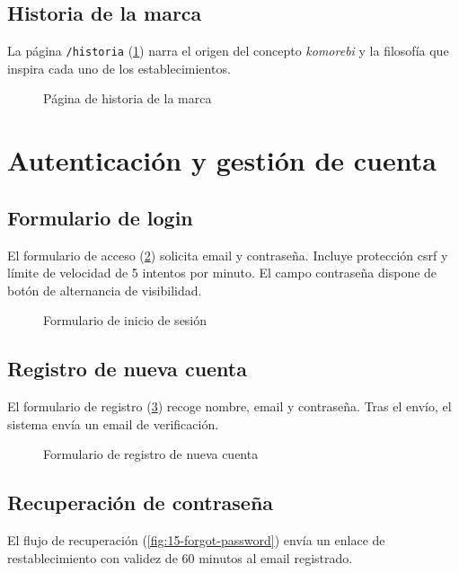 \documentclass[12pt,a4paper,twoside,openright]{report}
\begin{document}
\subsection{Historia de la marca}
La página \texttt{/historia} (\cref{fig:08-historia}) narra el origen del concepto
\textit{komorebi} y la filosofía que inspira cada uno de los establecimientos.

\begin{figure}[H]
  \centering
  \fbox{\rule{0pt}{6cm}\rule{12cm}{0pt}}
  \caption{Página de historia de la marca}
  \label{fig:08-historia}
\end{figure}

\section{Autenticación y gestión de cuenta}
\label{sec:manual-auth}

\subsection{Formulario de login}
El formulario de acceso (\cref{fig:13-login-form}) solicita email y contraseña.
Incluye protección \gls{csrf} y límite de velocidad de 5 intentos por minuto.
El campo contraseña dispone de botón de alternancia de visibilidad.

\begin{figure}[H]
  \centering
  \fbox{\rule{0pt}{6cm}\rule{12cm}{0pt}}
  \caption{Formulario de inicio de sesión}
  \label{fig:13-login-form}
\end{figure}

\subsection{Registro de nueva cuenta}
El formulario de registro (\cref{fig:14-registro-form}) recoge nombre, email y
contraseña. Tras el envío, el sistema envía un email de verificación.

\begin{figure}[H]
  \centering
  \fbox{\rule{0pt}{6cm}\rule{12cm}{0pt}}
  \caption{Formulario de registro de nueva cuenta}
  \label{fig:14-registro-form}
\end{figure}

\subsection{Recuperación de contraseña}
El flujo de recuperación (\cref{fig:15-forgot-password}) envía un enlace de
restablecimiento con validez de 60 minutos al email registrado.
\end{document}
